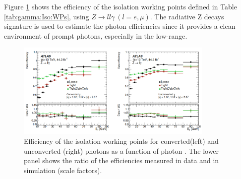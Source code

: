 Figure \ref{fig:gamma:Iso:Eff} shows the efficiency of the isolation working points defined in Table \ref{tab:gamma:Iso:WPs}, using $Z\rightarrow ll\gamma \ (l=e,\mu)$. The radiative Z decays signature is used to estimate the photon efficiencies since it provides a clean environment of prompt photons, especially in the low-\eT range. 
\begin{figure}[H]
    \centering
    \includegraphics[width=0.85\textwidth]{Ch3/Img/Photon_Iso_Eff.png}
    \caption{Efficiency of the isolation working points for converted(left) and unconverted (right) photons as a function of photon \eT. The lower panel shows the ratio of the efficiencies measured in data and in simulation (scale factors).}
    \label{fig:gamma:Iso:Eff}
\end{figure}
